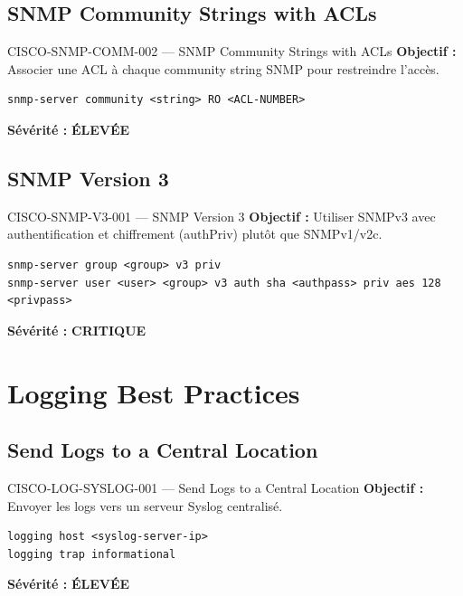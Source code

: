 \documentclass[12pt, a4paper]{report}
\begin{document}
\subsection{SNMP Community Strings with ACLs}

\begin{rulebox}{CISCO-SNMP-COMM-002 — SNMP Community Strings with ACLs}
  \textbf{Objectif :} Associer une ACL à chaque community string SNMP pour restreindre l'accès.

  \begin{lstlisting}
snmp-server community <string> RO <ACL-NUMBER>
  \end{lstlisting}

  \textbf{Sévérité :} \textcolor{accentOrange}{\textbf{ÉLEVÉE}}
\end{rulebox}

\subsection{SNMP Version 3}

\begin{rulebox}{CISCO-SNMP-V3-001 — SNMP Version 3}
  \textbf{Objectif :} Utiliser SNMPv3 avec authentification et chiffrement (authPriv) plutôt que SNMPv1/v2c.

  \begin{lstlisting}
snmp-server group <group> v3 priv
snmp-server user <user> <group> v3 auth sha <authpass> priv aes 128 <privpass>
  \end{lstlisting}

  \textbf{Sévérité :} \textcolor{accentRed}{\textbf{CRITIQUE}}
\end{rulebox}

\section{Logging Best Practices}

\subsection{Send Logs to a Central Location}

\begin{rulebox}{CISCO-LOG-SYSLOG-001 — Send Logs to a Central Location}
  \textbf{Objectif :} Envoyer les logs vers un serveur Syslog centralisé.

  \begin{lstlisting}
logging host <syslog-server-ip>
logging trap informational
  \end{lstlisting}

  \textbf{Sévérité :} \textcolor{accentOrange}{\textbf{ÉLEVÉE}}
\end{rulebox}
\end{document}
